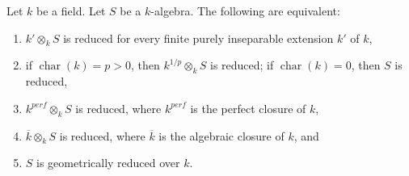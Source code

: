 \begin{lemma}
\label{lemma-geometrically-reduced-finite-purely-inseparable-extension}
Let $k$ be a field. Let $S$ be a $k$-algebra.
The following are equivalent:
\begin{enumerate}
\item $k' \otimes_k S$ is reduced for every finite
purely inseparable extension $k'$ of $k$,
\item if $\operatorname{char}(k)=p>0$, then
$k^{1/p}\otimes_k S$ is reduced; if
$\operatorname{char}(k)=0$, then $S$ is reduced,
\item $k^{perf} \otimes_k S$ is reduced, where $k^{perf}$ is the
perfect closure of $k$,
\item $\overline{k} \otimes_k S$ is reduced, where $\overline{k}$ is the
algebraic closure of $k$, and
\item $S$ is geometrically reduced over $k$.
\end{enumerate}
\end{lemma}


